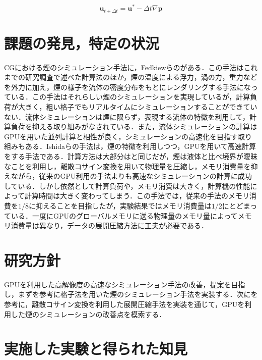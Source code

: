 \documentclass[10pt,a4paper,notitlepage,oneside,twocolumn]{abst_jsarticle}
\begin{document}
\begin{equation}\label{eq:colin_v}
\bm{u}_{t+\Delta t} = \bm{u}^* - \Delta t \nabla \bm{p}
\end{equation} 

\section{課題の発見，特定の状況}
CGにおける煙のシミュレーション手法に，Fedkiewらの\cite{fedkiew}がある．この手法はこれまでの研究調査で述べた計算法のほか，煙の温度による浮力，渦の力，重力などを外力に加え，煙の様子を流体の密度分布をもとにレンダリングする手法になっている．この手法はそれらしい煙のシミュレーションを実現しているが，計算負荷が大きく，粗い格子でもリアルタイムにシミュレーションすることができていない．流体シミュレーションは煙に限らず，表現する流体の特徴を利用して，計算負荷を抑える取り組みがなされている．また，流体シミュレーションの計算はGPUを用いた並列計算と相性が良く，シミュレーションの高速化を目指す取り組みもある．Ishidaらの手法\cite{GPU}は，煙の特徴を利用しつつ，GPUを用いて高速計算をする手法である．計算方法は大部分は\cite{fedkiew}と同じだが，煙は液体と比べ境界が曖昧なことを利用し，離散コサイン変換を用いて物理量を圧縮し，メモリ消費量を抑えながら，従来のGPU利用の手法よりも高速なシミュレーションの計算に成功している．しかし依然として計算負荷や，メモリ消費は大きく，計算機の性能によって計算時間は大きく変わってしまう．この手法では，従来の手法のメモリ消費を$1/8$に抑えることを目指したが，実験結果ではメモリ消費量は$1/2$にとどまっている．一度にGPUのグローバルメモリに送る物理量のメモリ量によってメモリ消費量は異なり，データの展開圧縮方法に工夫が必要である．

\section{研究方針}
GPUを利用した高解像度の高速なシミュレーション手法の改善，提案を目指し，まず\cite{fedkiew}を参考に格子法を用いた煙のシミュレーション手法を実装する．次に\cite{GPU}を参考に，離散コサイン変換を利用した展開圧縮手法を実装を通じて，GPUを利用した煙のシミュレーションの改善点を模索する．

\section{実施した実験と得られた知見}
 
\end{document}

